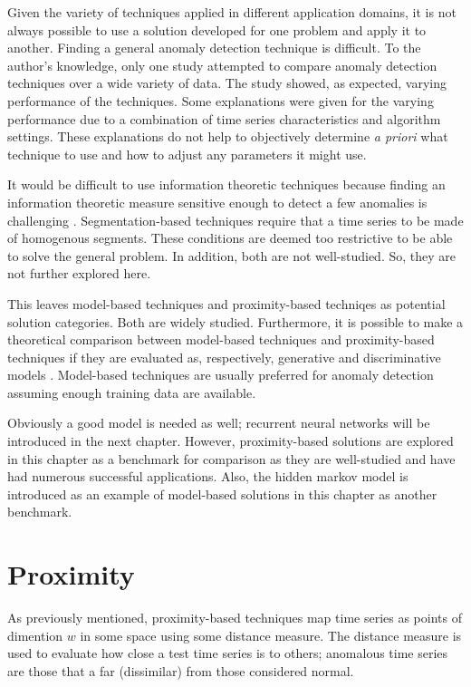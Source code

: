 Given the variety of techniques applied in different application domains, it is not always possible to use a solution developed for one problem and apply it to another. Finding a general anomaly detection technique is difficult. To the author's knowledge, only one study \cite{Cheboli2010} attempted to compare anomaly detection techniques over a wide variety of data. The study showed, as expected, varying performance of the techniques. Some explanations were given for the varying performance due to a combination of time series characteristics and algorithm settings. These explanations do not help to objectively determine \emph{a priori} what technique to use and how to adjust any parameters it might use.

It would be difficult to use information theoretic techniques because finding an information theoretic measure sensitive enough to detect a few anomalies is challenging \cite{Chandola2009}. Segmentation-based techniques require that a time series to be made of homogenous segments. These conditions are deemed too restrictive to be able to solve the general problem. In addition, both are not well-studied. So, they are not further explored here.

This leaves model-based techniques and proximity-based techniqes as potential solution categories. Both are widely studied. Furthermore, it is possible to make a theoretical comparison between model-based techniques and proximity-based techniques if they are evaluated as, respectively, generative and discriminative models \cite{Ng2006}. Model-based techniques are usually preferred for anomaly detection \cite{Ngkvist2014} assuming enough training data are available.

Obviously a good model is needed as well; recurrent neural networks will be introduced in the next chapter. However, proximity-based solutions are explored in this chapter as a benchmark for comparison as they are well-studied and have had numerous successful applications. Also, the hidden markov model is introduced as an example of model-based solutions in this chapter as another benchmark.


\section{Proximity}
\label{sec:adproximity}

As previously mentioned, proximity-based techniques map time series as points of dimention $w$ in some space using some distance measure. The distance measure is used to evaluate how close a test time series is to others; anomalous time series are those that a far (dissimilar) from those considered normal.

